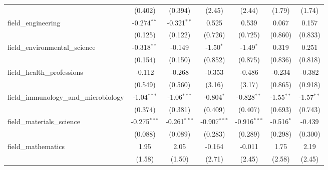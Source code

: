 \begin{tabular}{lcccccc}
                                                               & (0.402)        & (0.394)        & (2.45)         & (2.44)         & (1.79)         & (1.74)\\   
   field\_engineering                                          & -0.274$^{**}$  & -0.321$^{**}$  & 0.525          & 0.539          & 0.067          & 0.157\\   
                                                               & (0.125)        & (0.122)        & (0.726)        & (0.725)        & (0.860)        & (0.833)\\   
   field\_environmental\_science                               & -0.318$^{**}$  & -0.149         & -1.50$^{*}$    & -1.49$^{*}$    & 0.319          & 0.251\\   
                                                               & (0.154)        & (0.150)        & (0.852)        & (0.875)        & (0.836)        & (0.818)\\   
   field\_health\_professions                                  & -0.112         & -0.268         & -0.353         & -0.486         & -0.234         & -0.382\\   
                                                               & (0.549)        & (0.560)        & (3.16)         & (3.17)         & (0.865)        & (0.918)\\   
   field\_immunology\_and\_microbiology                        & -1.04$^{***}$  & -1.06$^{***}$  & -0.804$^{*}$   & -0.828$^{**}$  & -1.55$^{**}$   & -1.57$^{**}$\\   
                                                               & (0.374)        & (0.381)        & (0.409)        & (0.407)        & (0.693)        & (0.743)\\   
   field\_materials\_science                                   & -0.275$^{***}$ & -0.261$^{***}$ & -0.907$^{***}$ & -0.916$^{***}$ & -0.516$^{*}$   & -0.439\\   
                                                               & (0.088)        & (0.089)        & (0.283)        & (0.289)        & (0.298)        & (0.300)\\   
   field\_mathematics                                          & 1.95           & 2.05           & -0.164         & -0.011         & 1.75           & 2.19\\   
                                                               & (1.58)         & (1.50)         & (2.71)         & (2.45)         & (2.58)         & (2.45)\\   

\end{tabular}
